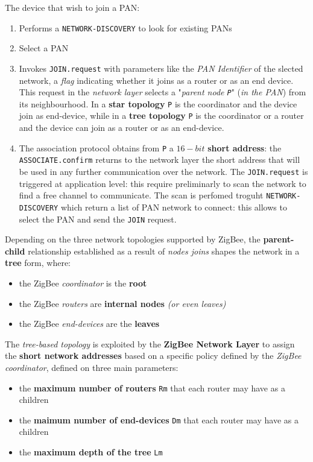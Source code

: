 \documentclass[10pt,a4paper]{report}
\theoremstyle{definition}
\begin{document}
The device that wish to join a PAN:
\begin{enumerate}
	\item 
	Performs a \texttt{NETWORK-DISCOVERY} to look for existing PANs
	\item 
	Select a PAN
	\item 
	Invokes \texttt{JOIN.request} with parameters like the \textit{PAN Identifier} of the slected network, a \textit{flag} indicating whether it joins as a router or as an end device. This request in the \textit{network layer} selects a "\textit{parent node \texttt{P}}" (\textit{in the PAN}) from its neighbourhood. In a \textbf{star topology} \texttt{P} is the coordinator and the device join as end-device, while in a \textbf{tree topology} \texttt{P} is the coordinator or a router and the device can join as a router or as an end-device.
	\item 
	The association protocol obtains from \texttt{P} a $16-bit$ \textbf{short address}: the \texttt{ASSOCIATE.confirm} returns to the network layer the short address that will be used in any further communication over the network.
	The \texttt{JOIN.request} is triggered at application level: this require preliminarly to scan the network to find a free channel to communicate. The scan is perfomed troguht \texttt{NETWORK-DISCOVERY} which return a list of PAN network to connect: this allows to select the PAN and send the \texttt{JOIN} request.

\end{enumerate}
	Depending on the three network topologies supported by ZigBee, the \textbf{parent-child} relationship established as a result of \textit{nodes joins} shapes the network in a \textbf{tree} form, where:
	\begin{itemize}
		\item the ZigBee \textit{coordinator} is the \textbf{root}
		\item the ZigBee \textit{routers} are \textbf{internal nodes} \textit{(or even leaves)}
		\item the ZigBee \textit{end-devices} are the \textbf{leaves}
	\end{itemize}
	The \textit{tree-based topology} is exploited by the \textbf{ZigBee Network Layer} to assign the \textbf{short network addresses} based on a specific policy defined by the \textit{ZigBee coordinator}, defined on three main parameters:
	\begin{itemize}
		\item the \textbf{maximum number of routers} \texttt{Rm} that each router may have as a children
		\item the \textbf{maimum number of end-devices} \texttt{Dm} that each router may have as a children
		\item the \textbf{maximum depth of the tree} \texttt{Lm}
	\end{itemize}
\end{document}
